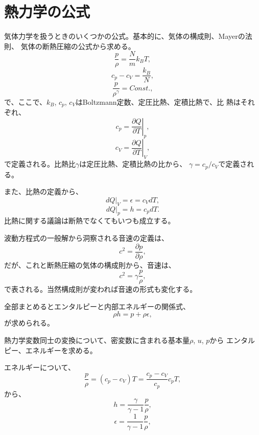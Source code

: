 
\section{熱力学の公式}  \label{ThermoDynamics}

気体力学を扱うときのいくつかの公式。基本的に、気体の構成則、Mayerの法則、
気体の断熱圧縮の公式から求める。
\begin{equation}
 \frac{p}{\rho}=\frac{N}{m}k_BT,
\end{equation}
\begin{equation}
 c_p - c_V = \frac{k_B}{N},
\end{equation}
\begin{equation}
 \frac{p}{\rho^\gamma}=Const.,
\end{equation}
で、ここで、$k_B$, $c_p$, $c_V$はBoltzmann定数、定圧比熱、定積比熱で、比
熱はそれぞれ、
\begin{equation}
 c_p = \left.\frac{\partial Q}{\partial T}\right|_p, 
\end{equation}
\begin{equation}
 c_V = \left.\frac{\partial Q}{\partial T}\right|_V, 
\end{equation}
で定義される。比熱比$\gamma$は定圧比熱、定積比熱の比から、
$\gamma = c_p / c_V$で定義される。

また、比熱の定義から、
\begin{equation}
 dQ|_V=\epsilon=c_VdT,
\end{equation}
\begin{equation}
 dQ|_p=h=c_pdT.
\end{equation}
比熱に関する議論は断熱でなくてもいつも成立する。

波動方程式の一般解から洞察される音速の定義は、
\begin{equation}
 c^2=\frac{\partial p}{\partial \rho},
\end{equation}
だが、これと断熱圧縮の気体の構成則から、音速は、
\begin{equation}
 c^2 = \gamma \frac{p}{\rho},
\end{equation}
で表される。当然構成則が変われば音速の形式も変化する。

全部まとめるとエンタルピーと内部エネルギーの関係式、
\begin{equation}
 \rho h = p + \rho \epsilon,
\end{equation}
が求められる。

熱力学変数同士の変換について、密変数に含まれる基本量$\rho$, $u$, $p$から
エンタルピー、エネルギーを求める。

エネルギーについて、
\[
 \frac{p}{\rho} = (c_p - c_V)T = \frac{c_p - c_V}{c_p}c_pT, 
\]
から、
\begin{equation}
 h = \frac{\gamma}{\gamma - 1}\frac{p}{\rho},
\end{equation}
\begin{equation}
 \epsilon = \frac{1}{\gamma - 1}\frac{p}{\rho},
\end{equation}

